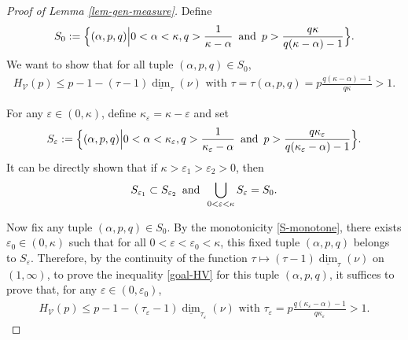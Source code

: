 \documentclass[12pt]{amsart}
\theoremstyle{definition}
\theoremstyle{remark}
\newcommand{\ldim}{\underline{\dim}}
\newcommand{\an}{\text{\, and \,}}
\numberwithin{equation}{section}
\begin{document}
\begin{proof}[Proof of Lemma \ref{lem-gen-measure}]
Define 
\[
S_0 : = \Big\{  (\alpha, p,q) \Big|  0< \alpha < \kappa, q>\frac{1}{\kappa-\alpha} \an p> \frac{q\kappa}{q(\kappa- \alpha) -1} \Big\}.
\]
We want to show that for all tuple $(\alpha, p, q)\in S_0$, 
\begin{align}\label{goal-HV}
H_\mathcal{V}(p)  \le     p-1 -  (\tau - 1) \ldim_{\tau}(\nu) \, \,
\text{with $\tau = \tau(\alpha, p, q) = p\frac{ q (\kappa - \alpha)  -1}{q \kappa}>1$.}
\end{align}


For any $\varepsilon\in (0, \kappa)$, define $\kappa_\varepsilon= \kappa- \varepsilon$ and set 
\[
S_\varepsilon: = \Big\{  (\alpha, p,q) \Big|  0< \alpha < \kappa_\varepsilon, q>\frac{1}{\kappa_\varepsilon-\alpha} \an p> \frac{q\kappa_\varepsilon}{q(\kappa_\varepsilon- \alpha) -1} \Big\}.
\]
It can be directly shown that if $\kappa> \varepsilon_1 >\varepsilon_2>0$, then 
\begin{align}\label{S-monotone}
S_{\varepsilon_1} \subset S_{\varepsilon_2} \an 
\bigcup_{0< \varepsilon< \kappa} S_\varepsilon = S_0.
\end{align}


Now fix any tuple $(\alpha, p, q)\in S_0$.  By the monotonicity \eqref{S-monotone},  there exists $\varepsilon_0\in (0, \kappa)$ such that for all $0< \varepsilon<\varepsilon_0<\kappa$,  this fixed tuple $(\alpha, p, q)$ belongs to $S_\varepsilon$.   Therefore, by  the continuity of  the function $\tau\mapsto (\tau-1)\ldim_\tau(\nu)$ on $(1, \infty)$, to prove the inequality \eqref{goal-HV} for this tuple $(\alpha, p, q)$, it suffices to prove that,   for any $\varepsilon \in (0, \varepsilon_0)$, 
\begin{align}\label{goal-HV-bis}
H_\mathcal{V}(p)  \le     p-1 -  (\tau_\varepsilon - 1) \ldim_{\tau_\varepsilon}(\nu) \, \,
\text{with $\tau_\varepsilon = p\frac{ q (\kappa_\varepsilon - \alpha)  -1}{q \kappa_\varepsilon}>1$.}
\end{align}



\end{proof}
\end{document}
